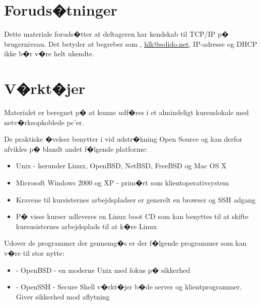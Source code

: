 \documentclass[a4paper,11pt,notitlepage]{oevelser}
\begin{document}
\section*{\color{titlecolor}Foruds�tninger}

Dette materiale foruds�tter at deltageren har kendskab til
TCP/IP p� brugerniveau. Det betyder at begreber som
,
\href{mailto:hlk@solido.net}{hlk@solido.net}, IP-adresse og DHCP
ikke b�r v�re helt ukendte.


\section*{\color{titlecolor}V�rkt�jer}

Materialet er beregnet p� at kunne udf�res i et almindeligt
kursuslokale med netv�rksopkoblede pc'er.

De praktiske �velser benytter i vid udstr�kning Open Source og
kan derfor afvikles p� blandt andet f�lgende platforme:
\begin{itemize}
\item Unix - herunder Linux, OpenBSD, NetBSD, FreeBSD og Mac OS X
\item Microsoft Windows 2000 og XP - prim�rt som
  klientoperativsystem
\item Kravene til kursisternes arbejdspladser er generelt en browser
  og SSH adgang
\item P� visse kurser udleveres en Linux boot CD som kan benyttes til
  at skifte kursusisternes arbejdsplads til at k�re Linux
\end{itemize}

Udover de programmer der gennemg�s er der f�lgende programmer som kan
v�re til stor nytte:
\begin{itemize}
\item {} - OpenBSD - en moderne Unix med
  fokus p� sikkerhed
\item {} - OpenSSH - Secure Shell
  v�rkt�jer b�de server og klientprogrammer. Giver sikkerhed mod aflytning
\end{itemize}

\rhead{\fancyplain{}{\bfseries \chaptername\ \thechapter}}
\end{document}
